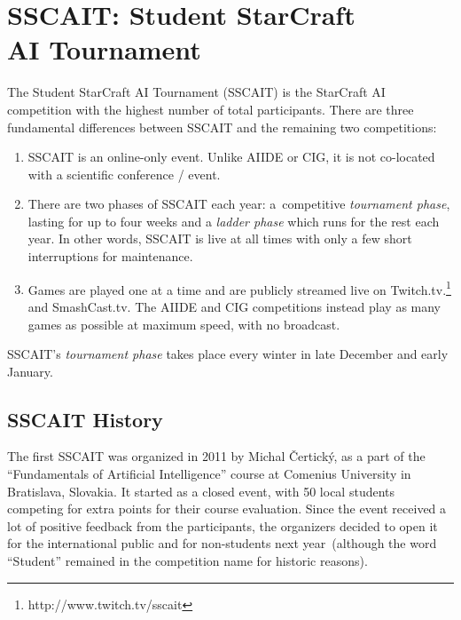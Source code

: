 \section{SSCAIT: Student StarCraft\\ AI Tournament}\label{subsecSSCAIT}

The Student StarCraft AI Tournament (SSCAIT) is the StarCraft AI competition with the highest number of total participants. There are three fundamental differences between SSCAIT and the remaining two competitions:
\begin{enumerate}
  \item SSCAIT is an online-only event. Unlike AIIDE or CIG, it is not co-located with a scientific conference / event. \item There are two phases of SSCAIT each year: a~competitive {\em tournament phase}, lasting for up to four weeks and a {\em ladder phase} which runs for the rest each year. In other words, SSCAIT is live at all times with only a few short interruptions for maintenance.
  \item Games are played one at a time and are publicly streamed live on Twitch.tv.\footnote{http://www.twitch.tv/sscait} and SmashCast.tv. The AIIDE and CIG competitions instead play as many games as possible at maximum speed, with no broadcast.
\end{enumerate}

SSCAIT's {\em tournament phase} takes place every winter in late December and early January. 

\subsection{SSCAIT History}

The first SSCAIT was organized in 2011 by Michal \v{C}ertick\'{y}, as a part of the ``Fundamentals of Artificial Intelligence'' course at Comenius University in Bratislava, Slovakia. It started as a closed event, with 50 local students competing for extra points for their course evaluation. Since the event received a lot of positive feedback from the participants, the organizers decided to open it for the international public and for non-students next year~(although the word ``Student'' remained in the competition name for historic reasons). 

